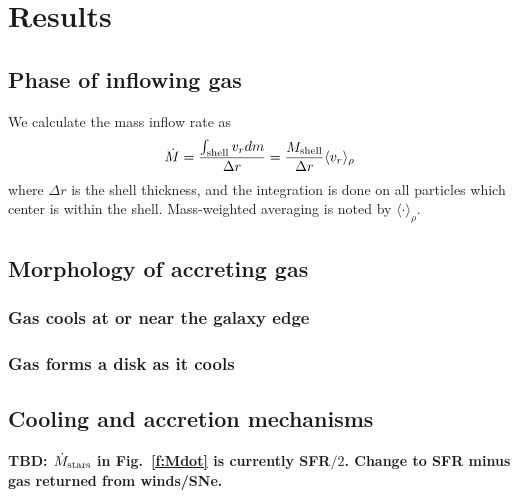 \documentclass[fleqn,usenatbib]{mnras}
\newcommand{\Mdot}{\dot{M}}
\begin{document}
\section{Results}

\subsection{Phase of inflowing gas}

We calculate the mass inflow rate as
\begin{equation}\label{e:Mdot}
     \Mdot = \frac{\int_{\rm shell} v_r dm}{\Delta r} = \frac{M_{\rm shell}}{\Delta r} \langle v_r\rangle_\rho
\end{equation}
where $\Delta r$ is the shell thickness, and the integration is done on all particles which center is within the shell. Mass-weighted averaging is noted by $\langle\cdot\rangle_\rho$.

\subsection{Morphology of accreting gas}

\subsubsection{Gas cools at or near the galaxy edge}

\subsubsection{Gas forms a disk as it cools}

\subsection{Cooling and accretion mechanisms}

\textbf{TBD: $\dot{M}_{\rm stars}$ in Fig.~\ref{f:Mdot} is currently SFR$/2$. Change to SFR minus gas returned from winds/SNe.}
    
\end{document}
